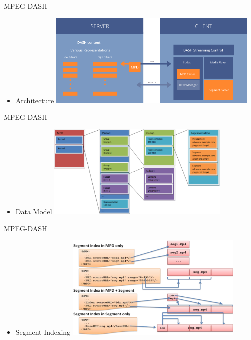 \documentclass{beamer}
\begin{document}
\begin{frame}{MPEG-DASH}
\begin{itemize}
\item Architecture
\includegraphics[height=4.5cm]{fig/MPEG-DASH_arch.png}
\end{itemize}
\end{frame}
\begin{frame}{MPEG-DASH}
\begin{itemize}
\item Data Model
\includegraphics[height=4.5cm]{fig/mpeg-dash_data_model.png}
\end{itemize}
\end{frame}
\begin{frame}{MPEG-DASH}
\begin{itemize}
\item Segment Indexing
\includegraphics[height=5cm]{fig/mpeg-dash_indexing.png}
\end{itemize}
\end{frame}
\end{document}
